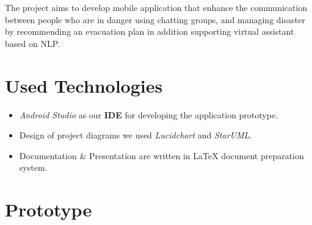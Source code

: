 \documentclass{scrreprt}
\begin{document}
The project aims to develop mobile application that enhance the
communication between people who are in danger using chatting groups, and managing disaster by recommending an evacuation plan in addition supporting virtual assistant based on NLP.



\section{Used Technologies}

\begin{itemize}
    \item \textit{Android Studio} as our \textbf{IDE} for developing the application prototype.
    \item Design of project diagrams we used \textit{Lucidchart} and \textit{StarUML}.
    \item Documentation \& Presentation are written in \LaTeX \hspace{0.2mm} document preparation system.
\end{itemize}

    


\newpage
\section{Prototype}
\end{document}
